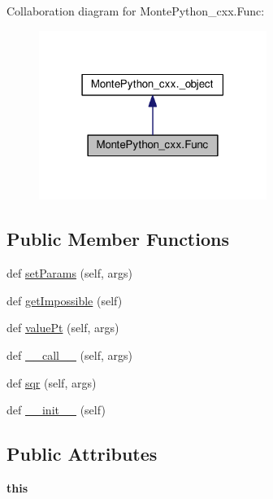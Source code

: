 Collaboration diagram for Monte\+Python\+\_\+cxx.\+Func\+:
\nopagebreak
\begin{figure}[H]
\begin{center}
\leavevmode
\includegraphics[width=210pt]{classMontePython__cxx_1_1Func__coll__graph}
\end{center}
\end{figure}
\subsection*{Public Member Functions}
\begin{DoxyCompactItemize}
\item 
def \hyperlink{classMontePython__cxx_1_1Func_a84b9bc6208735485c30d1b21182ed81f}{set\+Params} (self, args)
\item 
def \hyperlink{classMontePython__cxx_1_1Func_a6a6ab69fac1f1629d90499011237c631}{get\+Impossible} (self)
\item 
def \hyperlink{classMontePython__cxx_1_1Func_a53476af0f03d502c63a4ae2a65f4a0b7}{value\+Pt} (self, args)
\item 
def \hyperlink{classMontePython__cxx_1_1Func_a9ca4408c85ae96c8feae3f20bb288144}{\+\_\+\+\_\+call\+\_\+\+\_\+} (self, args)
\item 
def \hyperlink{classMontePython__cxx_1_1Func_ad38accd52a7370704b5482e6dbcb88cb}{sqr} (self, args)
\item 
def \hyperlink{classMontePython__cxx_1_1Func_a09bc358cbee40b7e742c474cb3d8cd8c}{\+\_\+\+\_\+init\+\_\+\+\_\+} (self)
\end{DoxyCompactItemize}
\subsection*{Public Attributes}
\begin{DoxyCompactItemize}
\item 
\hypertarget{classMontePython__cxx_1_1Func_ad3085ee8b7efab758df39e0970220b8f}{}{\bfseries this}\label{classMontePython__cxx_1_1Func_ad3085ee8b7efab758df39e0970220b8f}

\end{DoxyCompactItemize}
